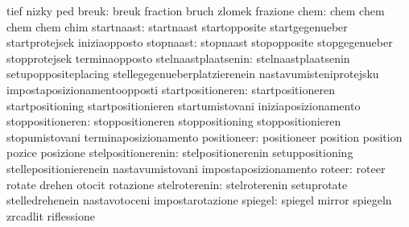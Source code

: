                                   tief                             nizky
                                  ped
                           breuk: breuk                            fraction
                                  bruch                            zlomek
                                  frazione
                            chem: chem                             chem
                                  chem                             chem
                                  chim
                      startnaast: startnaast                       startopposite
                                  startgegenueber                  startprotejsek
                                  iniziaopposto
                       stopnaast: stopnaast                        stopopposite
                                  stopgegenueber                   stopprotejsek
                                  terminaopposto
             stelnaastplaatsenin: stelnaastplaatsenin              setupoppositeplacing
                                  stellegegenueberplatzierenein    nastavumisteniprotejsku
                                  impostaposizionamentoopposti
               startpositioneren: startpositioneren                startpositioning
                                  startpositionieren               startumistovani
                                  iniziaposizionamento
                stoppositioneren: stoppositioneren                 stoppositioning
                                  stoppositionieren                stopumistovani
                                  terminaposizionamento
                     positioneer: positioneer                      position
                                  position                         pozice
                                  posizione
              stelpositionerenin: stelpositionerenin               setuppositioning
                                  stellepositionierenein           nastavumistovani
                                  impostaposizionamento
                          roteer: roteer                           rotate
                                  drehen                           otocit
                                  rotazione                        %
                   stelroterenin: stelroterenin                    setuprotate
                                  stelledrehenein                  nastavotoceni
                                  impostarotazione
                         spiegel: spiegel                          mirror
                                  spiegeln                         zrcadlit
                                  riflessione
